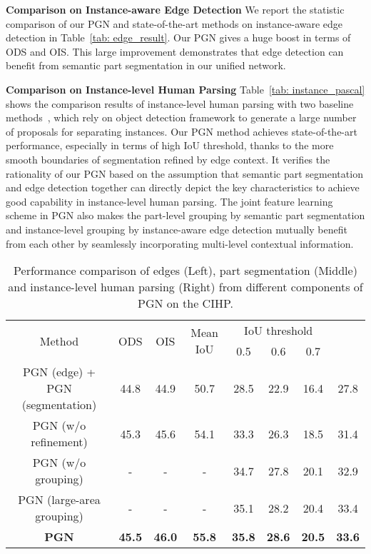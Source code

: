 \documentclass[runningheads]{llncs}
\begin{document}
\textbf{Comparison on Instance-aware Edge Detection} 
We report the statistic comparison of our PGN and state-of-the-art methods on instance-aware edge detection in Table~\ref{tab: edge_result}. Our PGN gives a huge boost in terms of ODS and OIS. This large improvement demonstrates that edge detection can benefit from semantic part segmentation in our unified network.

\textbf{Comparison on Instance-level Human Parsing} 
Table~\ref{tab: instance_pascal} shows the comparison results of instance-level human parsing with two baseline methods~\cite{Dai_2016_CVPR,li2017holistic}, which rely on object detection framework to generate a large number of proposals for separating instances. Our PGN method achieves state-of-the-art performance, especially in terms of high IoU threshold, thanks to the more smooth boundaries of segmentation refined by edge context. It verifies the rationality of our PGN based on the assumption that semantic part segmentation and edge detection together can directly depict the key characteristics to achieve good capability in instance-level human parsing. The joint feature learning scheme in PGN also makes the part-level grouping by semantic part segmentation and instance-level grouping by instance-aware edge detection mutually benefit from each other by seamlessly incorporating multi-level contextual information.

\begin{table}[t]
\centering
\small
\caption{Performance comparison of edges (Left), part segmentation (Middle) and instance-level human parsing (Right) from different components of PGN on the CIHP.}
\tabcolsep 0.03in 
\begin{tabular}{c|cc|c|cccc}
\toprule[0.7pt]
\multirow{2}{*}{Method}        &  \multirow{2}{*}{ODS} & \multirow{2}{*}{OIS} & \multirow{2}{*}{Mean IoU} 
                               & \multicolumn{3}{c}{IoU threshold} &  \multirow{2}{*}{}   \\ 
                                &   &  &  & 0.5 & 0.6 & 0.7 &   \\ \hline                     
PGN (edge) + PGN (segmentation) & 44.8       & 44.9      & 50.7   & 28.5  & 22.9  & 16.4  & 27.8  \\
PGN (w/o refinement)            & 45.3       & 45.6      & 54.1   & 33.3  & 26.3  & 18.5  & 31.4  \\   
PGN (w/o grouping)              & -          & -         & -      & 34.7  & 27.8  & 20.1  & 32.9  \\
PGN (large-area grouping)       & -          & -         & -      & 35.1  & 28.2  & 20.4  & 33.4  \\     \hline
\textbf{PGN}   & \textbf{45.5} & \textbf{46.0} & \textbf{55.8} & \textbf{35.8} & \textbf{28.6} & \textbf{20.5} & \textbf{33.6} \\   
\toprule[0.7pt]
\end{tabular}
\vspace{-8mm}
\label{tab: results_cihp}
\end{table}
\end{document}
